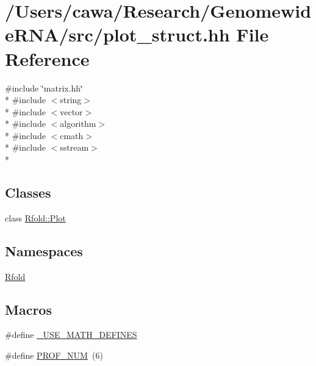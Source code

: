 \hypertarget{plot__struct_8hh}{\section{/\+Users/cawa/\+Research/\+Genomewide\+R\+N\+A/src/plot\+\_\+struct.hh File Reference}
\label{plot__struct_8hh}
}
{\ttfamily \#include \char`\"{}matrix.\+hh\char`\"{}}\\*
{\ttfamily \#include $<$string$>$}\\*
{\ttfamily \#include $<$vector$>$}\\*
{\ttfamily \#include $<$algorithm$>$}\\*
{\ttfamily \#include $<$cmath$>$}\\*
{\ttfamily \#include $<$sstream$>$}\\*
\subsection*{Classes}
\begin{DoxyCompactItemize}
\item 
class \hyperlink{class_rfold_1_1_plot}{Rfold\+::\+Plot}
\end{DoxyCompactItemize}
\subsection*{Namespaces}
\begin{DoxyCompactItemize}
\item 
 \hyperlink{namespace_rfold}{Rfold}
\end{DoxyCompactItemize}
\subsection*{Macros}
\begin{DoxyCompactItemize}
\item 
\#define \hyperlink{plot__struct_8hh_a525335710b53cb064ca56b936120431e}{\+\_\+\+U\+S\+E\+\_\+\+M\+A\+T\+H\+\_\+\+D\+E\+F\+I\+N\+E\+S}
\item 
\#define \hyperlink{plot__struct_8hh_a2157e7b8a768152a4baebc430cdbe941}{P\+R\+O\+F\+\_\+\+N\+U\+M}~(6)
\end{DoxyCompactItemize}


